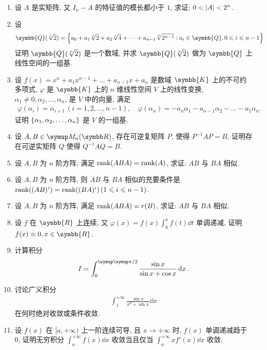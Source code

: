 \documentclass{ctexart}
\let\umathpi\pi
\renewcommand\pi{\symup\umathpi}%
\let\set\qty
\let\le\leqslant
\newcommand{\R}{\ensuremath{\symbb{R}}}
\newcommand{\K}{\ensuremath{\symbb{K}}}
\newcommand{\Q}{\ensuremath{\symbb{Q}}}
\begin{document}
\begin{enumerate}[series=exer]
    \item 设 $ A $ 是实矩阵, 又 $ I_{n} - A $ 的特征值的模长都小于 $ 1 $, 求证: $ 0<\abs{A}<2^{n} $. 
    \item 设
    \begin{align*}
        \Q(\sqrt[n]{2}) = \set{a_{0} + a_{1}\sqrt[n]{2} + a_{2}\sqrt[n]{4} + \dots + a_{n-1}\sqrt[n]{2^{n-1}} : a_{i} \in \Q, 0\le i\le n-1}
    \end{align*}
    证明 $ \Q(\sqrt[n]{2}) $ 是一个数域, 并求 $ \Q(\sqrt[n]{2}) $ 做为 $ \Q $ 上线性空间的一组基.
    \item 设 $ f(x) = x^{n} + a_{1}x^{n-1} + \dots + a_{n-1}x + a_{n} $ 是数域 $ \K $ 上的不可约多项式, $ \varphi $ 是 $ \K $ 上的 $ n $ 维线性空间 $ V $ 上的线性变换, $ \alpha_{1} \ne 0, \alpha_{2}, \dots, \alpha_{n} $, 是 $ V $ 中的向量, 满足 
    \begin{align*}
        \varphi(\alpha_{i}) = \alpha_{i + 1}\,(i = 1, 2, \dots, n-1), \quad \varphi(\alpha_{n}) = -a_{n}\alpha_{1} - a_{n-1}\alpha_{2} - \dots - a_{1}\alpha_{n}.
    \end{align*}
    证明 $ \set{\alpha_{1}, \alpha_{2}, \dots, \alpha_{n}} $ 是 $ V $ 的一组基. 
    \item 设 $ A, B \in \MM $, 存在可逆复矩阵 $ P $, 使得 $ P^{-1}AP = B $, 证明存在可逆实矩阵 $ Q $ 使得 $ Q^{-1}AQ = B $.   
    \item 设 $ A, B $ 为 $ n $ 阶方阵, 满足 $ \rank(ABA) = \rank(A) $, 求证: $ AB $ 与 $ BA $ 相似.
    \item 设 $ A, B $ 为 $ n $ 阶方阵, 则 $ AB $ 与 $ BA $ 相似的充要条件是 $ \rank((AB)^{i}) = \rank((BA)^{i})\,(1 \le i \le n - 1) $.
    \item  设 $ A, B $ 为 $ n $ 阶方阵, 满足 $ \rank(ABA) = r(B) $, 求证: $ AB $ 与 $ BA $ 相似.
    \item 设 $ f $ 在 $ \R $ 上连续, 又 $ \varphi(x) = f(x)\int_{0}^{x} f(t) \dd{t} $ 单调递减, 证明 $ f(x) \equiv 0, x\in\R $.
    \item 计算积分
    \begin{align*}
        I = \int_{0}^{\pi/2} \frac{\sin x}{\sin x + \cos x} \dd{x}.
    \end{align*}
    \item 讨论广义积分
    \begin{align*}
        \int_{1}^{+\infty} \frac{\sin x}{x^{p} + \sin x} \dd{x}
    \end{align*}
    在何时绝对收敛或条件收敛.
    \item 设 $ f(x) $ 在 $ [a, +\infty) $ 上一阶连续可导, 且 $ x \to +\infty $ 时, $ f(x) $ 单调递减趋于 $ 0 $, 证明无穷积分 $ \int_{a}^{+\infty} f(x) \dd{x} $ 收敛当且仅当 $ \int_{a}^{+\infty} xf'(x) \dd{x} $ 收敛. 

\end{enumerate}
\end{document}
